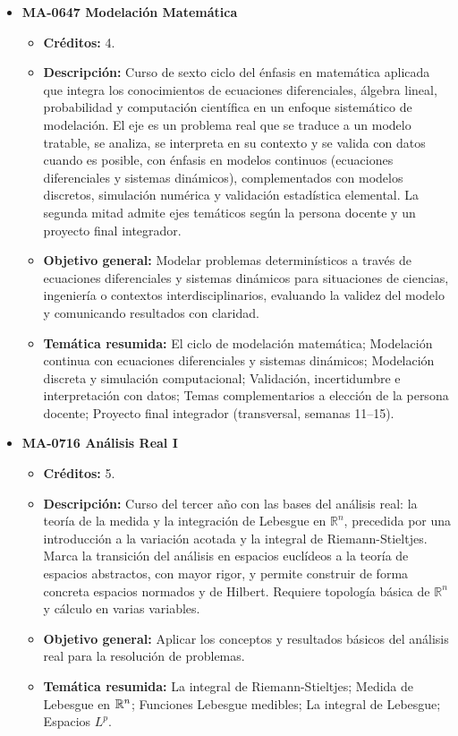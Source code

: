 \begin{itemize}[leftmargin=1.3em, itemsep=10pt, topsep=4pt, label={\color{Azul-UCR}$\blacksquare$}]
\item {\color{Azul-UCR}\textbf{MA-0647 Modelación Matemática}}\par\nopagebreak\smallskip
\begin{itemize}[leftmargin=1.1em, itemsep=3pt, topsep=2pt, parsep=2pt, label={\textendash}]
\item \textbf{Créditos:} 4.
\item \textbf{Descripción:} Curso de sexto ciclo del énfasis en matemática aplicada que integra los conocimientos de ecuaciones diferenciales, álgebra lineal, probabilidad y computación científica en un enfoque sistemático de modelación. El eje es un problema real que se traduce a un modelo tratable, se analiza, se interpreta en su contexto y se valida con datos cuando es posible, con énfasis en modelos continuos (ecuaciones diferenciales y sistemas dinámicos), complementados con modelos discretos, simulación numérica y validación estadística elemental. La segunda mitad admite ejes temáticos según la persona docente y un proyecto final integrador.
\item \textbf{Objetivo general:} Modelar problemas determinísticos a través de ecuaciones diferenciales y sistemas dinámicos para situaciones de ciencias, ingeniería o contextos interdisciplinarios, evaluando la validez del modelo y comunicando resultados con claridad.
\item \textbf{Temática resumida:} El ciclo de modelación matemática; Modelación continua con ecuaciones diferenciales y sistemas dinámicos; Modelación discreta y simulación computacional; Validación, incertidumbre e interpretación con datos; Temas complementarios a elección de la persona docente; Proyecto final integrador (transversal, semanas 11--15).
\end{itemize}

\item {\color{Azul-UCR}\textbf{MA-0716 Análisis Real I}}\par\nopagebreak\smallskip
\begin{itemize}[leftmargin=1.1em, itemsep=3pt, topsep=2pt, parsep=2pt, label={\textendash}]
\item \textbf{Créditos:} 5.
\item \textbf{Descripción:} Curso del tercer año con las bases del análisis real: la teoría de la medida y la integración de Lebesgue en $\mathbb{R}^n$, precedida por una introducción a la variación acotada y la integral de Riemann-Stieltjes. Marca la transición del análisis en espacios euclídeos a la teoría de espacios abstractos, con mayor rigor, y permite construir de forma concreta espacios normados y de Hilbert. Requiere topología básica de $\mathbb{R}^n$ y cálculo en varias variables.
\item \textbf{Objetivo general:} Aplicar los conceptos y resultados básicos del análisis real para la resolución de problemas.
\item \textbf{Temática resumida:} La integral de Riemann-Stieltjes; Medida de Lebesgue en $\mathbb{R}^n$; Funciones Lebesgue medibles; La integral de Lebesgue; Espacios $L^p$.
\end{itemize}


\end{itemize}
